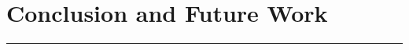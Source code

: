 \documentclass[12pt,phd,times]{pkmthesis}
\begin{document}
\label{chap:intermediate_results}



\chapter{Conclusion and Future Work}
\vspace{-1cm}
\noindent \rule{6.6in}{0.01in}
\label{chap:cons_fscope}








\end{document}
